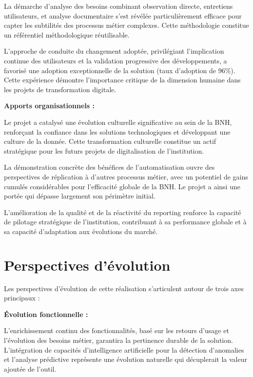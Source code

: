 \medskip

La démarche d'analyse des besoins combinant observation directe, entretiens utilisateurs, et analyse documentaire s'est révélée particulièrement efficace pour capter les subtilités des processus métier complexes. Cette méthodologie constitue un référentiel méthodologique réutilisable.

\medskip

L'approche de conduite du changement adoptée, privilégiant l'implication continue des utilisateurs et la validation progressive des développements, a favorisé une adoption exceptionnelle de la solution (taux d'adoption de 96\%). Cette expérience démontre l'importance critique de la dimension humaine dans les projets de transformation digitale.

\medskip

\textbf{Apports organisationnels :}

Le projet a catalysé une évolution culturelle significative au sein de la BNH, renforçant la confiance dans les solutions technologiques et développant une culture de la donnée. Cette transformation culturelle constitue un actif stratégique pour les futurs projets de digitalisation de l'institution.

\medskip

La démonstration concrète des bénéfices de l'automatisation ouvre des perspectives de réplication à d'autres processus métier, avec un potentiel de gains cumulés considérables pour l'efficacité globale de la BNH. Le projet a ainsi une portée qui dépasse largement son périmètre initial.

\medskip

L'amélioration de la qualité et de la réactivité du reporting renforce la capacité de pilotage stratégique de l'institution, contribuant à sa performance globale et à sa capacité d'adaptation aux évolutions du marché.

\section*{Perspectives d'évolution}

Les perspectives d'évolution de cette réalisation s'articulent autour de trois axes principaux :

\medskip

\textbf{Évolution fonctionnelle :}

L'enrichissement continu des fonctionnalités, basé sur les retours d'usage et l'évolution des besoins métier, garantira la pertinence durable de la solution. L'intégration de capacités d'intelligence artificielle pour la détection d'anomalies et l'analyse prédictive représente une évolution naturelle qui décuplerait la valeur ajoutée de l'outil.

